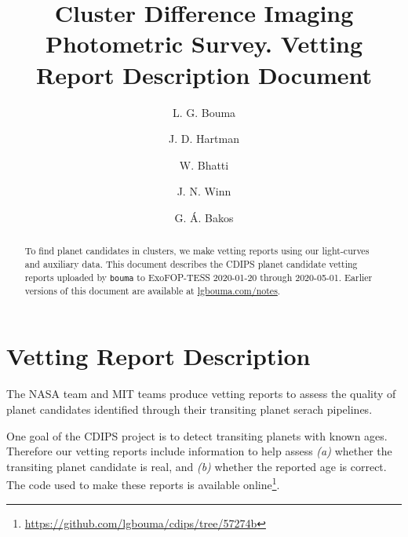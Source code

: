 \documentclass[12pt,twocolumn,tighten]{aastex62}
\begin{document}
\title{
  Cluster Difference Imaging Photometric Survey.
  Vetting Report Description Document
}


\author[0000-0002-0514-5538]{L. G. Bouma}
%
\author[0000-0001-8732-6166]{J. D. Hartman}
%
\author[0000-0002-0628-0088]{W. Bhatti}
%
\author[0000-0002-4265-047X]{J. N. Winn}
%
\author[0000-0001-7204-6727]{G. \'A. Bakos}

\begin{abstract}
To find planet candidates in clusters, we make vetting reports using
our light-curves \citep{bouma_cdips_2019} and auxiliary data.  This
document describes the CDIPS planet candidate vetting reports
uploaded by \texttt{bouma} to ExoFOP-TESS 2020-01-20 through
2020-05-01.  Earlier versions of this document are available at
\url{lgbouma.com/notes}.
\\

\end{abstract}


\section{Vetting Report Description}
\label{appendix:vetreport}

The NASA team and MIT teams \citep{jenkins_spoc_2010,huang_tess_2018}
produce vetting reports to assess the quality of planet candidates
identified through their transiting planet serach pipelines.

One goal of the CDIPS project is to detect transiting planets with
known ages.  Therefore our vetting reports include information to help
assess {\it (a)} whether the transiting planet candidate is real, and
{\it (b)} whether the reported age is correct.
The code used to make these reports is available online\footnote{
  \url{https://github.com/lgbouma/cdips/tree/57274b}}.
\end{document}
